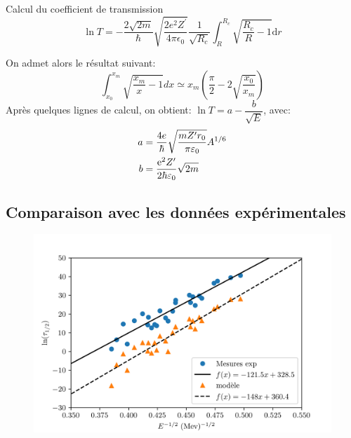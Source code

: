 \documentclass[10pt]{beamer}
\newcommand{\diff}{\mathrm{d}}
\begin{document}
\begin{frame}{Calcul du coefficient de transmission}
    \begin{equation}
        \ln T = - \dfrac{2\sqrt{2m}}{\hbar}\sqrt{\dfrac{2e^2Z^\prime}{4\pi\epsilon_0}}\dfrac{1}{\sqrt{R_c}}\int_R^{R_c}\sqrt{\dfrac{R_c}{R}-1}\diff r
    \end{equation}

On admet alors le résultat suivant:
    \begin{equation*}
        \int_{x_0}^{x_m}\sqrt{\frac{x_m}{x}-1}dx\simeq x_m\left(\frac{\pi}{2}-2\sqrt{\frac{x_0}{x_m}}\right)
    \end{equation*}
Après quelques lignes de calcul, on obtient: $\ln T = a - \dfrac{b}{\sqrt{E}}$, avec:
\begin{align*}
    a&=\frac{4e}{\hbar}\sqrt{\frac{mZ'r_0}{\pi\varepsilon_0}}A^{1/6}\\
    b&=\frac{{\rm e}^2Z'}{2\hbar\varepsilon_0}\sqrt{2m}
\end{align*}
\end{frame}

\subsection{Comparaison avec les données expérimentales}
\begin{frame}{\insertsubsection}
    \begin{figure}
        \centering
        \includegraphics[width=1\textwidth]{Radioactivite_alpha.png}
    \end{figure}
\end{frame}
\end{document}
